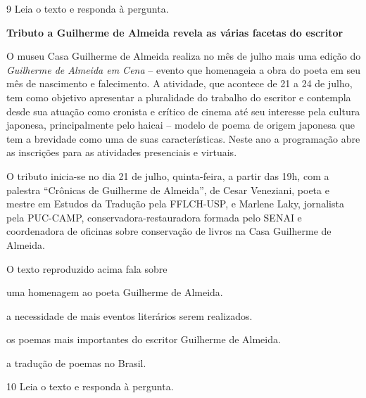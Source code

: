 \num{9} Leia o texto e responda à pergunta.

\begin{myquote}
\textbf{Tributo a Guilherme de Almeida revela as várias facetas do 
escritor}

O museu Casa Guilherme de Almeida realiza no mês de julho mais uma
edição do \textit{Guilherme de Almeida em Cena} -- evento que homenageia a obra
do poeta em seu mês de nascimento e falecimento. A atividade, que
acontece de 21 a 24 de julho, tem como objetivo apresentar a pluralidade
do trabalho do escritor e contempla desde sua atuação como cronista e
crítico de cinema até seu interesse pela cultura japonesa,
principalmente pelo haicai -- modelo de poema de origem japonesa que tem
a brevidade como uma de suas características. Neste ano a programação
abre as inscrições para as atividades presenciais e virtuais.

O tributo inicia-se no dia 21 de julho, quinta-feira, a partir das 19h, com
a palestra ``Crônicas de Guilherme de Almeida'', de Cesar Veneziani,
poeta e mestre em Estudos da Tradução pela FFLCH-USP, e Marlene Laky,
jornalista pela PUC-CAMP, conservadora-restauradora formada pelo SENAI e
coordenadora de oficinas sobre conservação de livros na Casa Guilherme
de Almeida.

\end{myquote}

O texto reproduzido acima fala sobre

\begin{escolha}
  \item uma homenagem ao poeta Guilherme de Almeida.

  \item a necessidade de mais eventos literários serem realizados.

  \item os poemas mais importantes do escritor Guilherme de Almeida.

  \item a tradução de poemas no Brasil.
\end{escolha}

\pagebreak
\num{10} Leia o texto e responda à pergunta.

